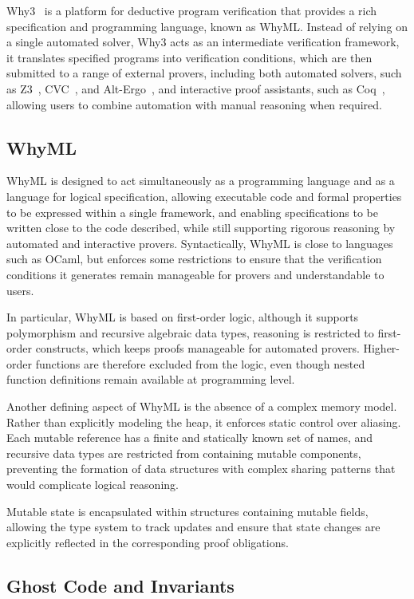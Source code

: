 Why3~\cite{why3} is a platform for deductive program verification that provides a rich specification and programming language, known as WhyML. Instead of relying on a single automated solver, Why3 acts as an intermediate verification framework, it translates specified programs into verification conditions, which are then submitted to a range of external provers, including both automated solvers, such as Z3~\cite{z3}, CVC~\cite{cvc}, and Alt-Ergo~\cite{alt-ergo}, and interactive proof assistants, such as Coq~\cite{coq}, allowing users to combine automation with manual reasoning when required.

\subsection{WhyML}
\label{sub:whyml}

WhyML is designed to act simultaneously as a programming language and as a language for logical specification, allowing executable code and formal properties to be expressed within a single framework, and enabling specifications to be written close to the code described, while still supporting rigorous reasoning by automated and interactive provers. Syntactically, WhyML is close to languages such as OCaml, but enforces some restrictions to ensure that the verification conditions it generates remain manageable for provers and understandable to users.

In particular, WhyML is based on first-order logic, although it supports polymorphism and recursive algebraic data types, reasoning is restricted to first-order constructs, which keeps proofs manageable for automated provers. Higher-order functions are therefore excluded from the logic, even though nested function definitions remain available at programming level.

Another defining aspect of WhyML is the absence of a complex memory model. Rather than explicitly modeling the heap, it enforces static control over aliasing. Each mutable reference has a finite and statically known set of names, and recursive data types are restricted from containing mutable components, preventing the formation of data structures with complex sharing patterns that would complicate logical reasoning.

Mutable state is encapsulated within structures containing mutable fields, allowing the type system to track updates and ensure that state changes are explicitly reflected in the corresponding proof obligations.

\subsection{Ghost Code and Invariants}
\label{sub:ghost}

